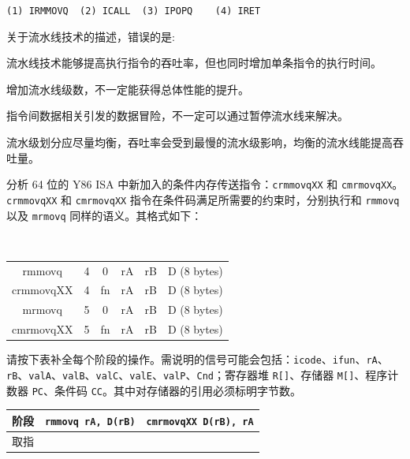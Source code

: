 \begin{problems}
\begin{choices}
            \item \verb|(1) IRMMOVQ  (2) ICALL  (3) IPOPQ    (4) IRET|
        \end{choices}
         关于流水线技术的描述，错误的是: 
        \begin{choices}
            \item 流水线技术能够提高执行指令的吞吐率，但也同时增加单条指令的执行时间。
            \item 增加流水线级数，不一定能获得总体性能的提升。
            \item 指令间数据相关引发的数据冒险，不一定可以通过暂停流水线来解决。
            \item 流水级划分应尽量均衡，吞吐率会受到最慢的流水级影响，均衡的流水线能提高吞吐量。
        \end{choices}
         分析 64 位的 Y86 ISA 中新加入的条件内存传送指令：\verb|crmmovqXX| 和 \verb|cmrmovqXX|。\verb|crmmovqXX| 和 \verb|cmrmovqXX| 指令在条件码满足所需要的约束时，分别执行和 \verb|rmmovq| 以及 \verb|mrmovq| 同样的语义。其格式如下：
        \begin{table}[H]
            \tt
            \centering
            \begin{tabular}{c|c|c|c|c|c|}
                \cline{2-6}
                rmmovq & 4 & 0 & rA & rB & D (8 bytes) \\ \cline{2-6} 
                crmmovqXX & 4 & fn & rA & rB & D (8 bytes) \\ \cline{2-6} 
                mrmovq & 5 & 0 & rA & rB & D (8 bytes) \\ \cline{2-6} 
                cmrmovqXX & 5 & fn & rA & rB & D (8 bytes) \\ \cline{2-6} 
            \end{tabular}
        \end{table}
        \qn 请按下表补全每个阶段的操作。需说明的信号可能会包括：\verb|icode|、\verb|ifun|、\verb|rA|、\verb|rB|、\verb|valA|、\verb|valB|、\verb|valC|、\verb|valE|、\verb|valP|、\verb|Cnd|；寄存器堆 \verb|R[]|、存储器 \verb|M[]|、程序计数器 \verb|PC|、条件码 \verb|CC|。其中对存储器的引用必须标明字节数。
        \begin{table}[H]
            \centering
            \begin{tabular}{|c|c|c|}
                \hline
                阶段 & {\qquad} \verb|rmmovq rA, D(rB)| {\qquad} & {\qquad} \verb|cmrmovqXX D(rB), rA| {\qquad} \\ \hline
                取指 & \multicolumn{2}{c|}{\rule{0pt}{8ex}} \\ \hline

\end{tabular}
\end{table}
\end{problems}
